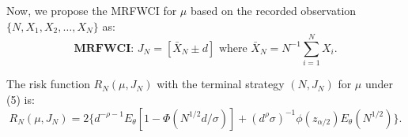 \documentclass [xcolor=svgnames, t] {beamer}
\begin{document}
\begin{frame}
\vspace{10mm}
Now, we propose the MRFWCI for $\mu$ based on the recorded observation $\{N,X_1,X_2,\dots ,X_N\}$ as:
    \begin{equation*}
    \textbf{MRFWCI: }J_N=[\bar{X}_N \pm d] \text{ where }\bar{X}_N=N^{-1} \sum_{i=1}^N{X_i}.    
    \end{equation*}
    
    The risk function $R_N(\mu,J_N)$ with the terminal strategy $(N,J_N)$ for $\mu$ under (5) is:
    \begin{equation*}
        R_N(\mu,J_N) = 2\{ d^{-\rho-1} E_{\theta}[1-\Phi(N^{1/2}d/\sigma)]+ (d^{\rho}\sigma)^{-1}\phi(z_{\alpha/2})E_{\theta}(N^{1/2})\}.
    \end{equation*}
    
    
\end{frame}

\end{document}
